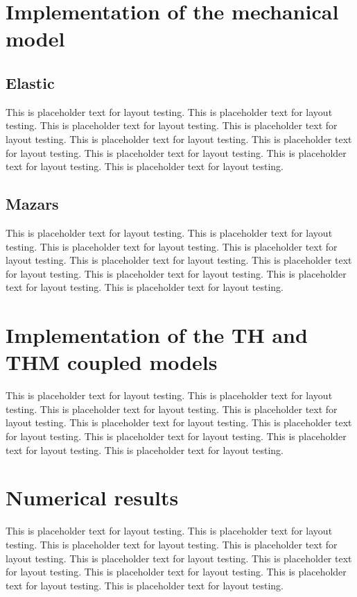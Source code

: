 \documentclass[a4paper,12pt,twoside]{report}     %
\begin{document}
\section{Implementation of the mechanical model}
\subsection{Elastic}
This is placeholder text for layout testing. This is placeholder text for layout testing. This is placeholder text for layout testing. This is placeholder text for layout testing. This is placeholder text for layout testing. This is placeholder text for layout testing. This is placeholder text for layout testing. This is placeholder text for layout testing. This is placeholder text for layout testing.
\subsection{Mazars}
This is placeholder text for layout testing. This is placeholder text for layout testing. This is placeholder text for layout testing. This is placeholder text for layout testing. This is placeholder text for layout testing. This is placeholder text for layout testing. This is placeholder text for layout testing. This is placeholder text for layout testing. This is placeholder text for layout testing.

\section{Implementation of the TH and THM coupled models}
This is placeholder text for layout testing. This is placeholder text for layout testing. This is placeholder text for layout testing. This is placeholder text for layout testing. This is placeholder text for layout testing. This is placeholder text for layout testing. This is placeholder text for layout testing. This is placeholder text for layout testing. This is placeholder text for layout testing.

\section{Numerical results}
This is placeholder text for layout testing. This is placeholder text for layout testing. This is placeholder text for layout testing. This is placeholder text for layout testing. This is placeholder text for layout testing. This is placeholder text for layout testing. This is placeholder text for layout testing. This is placeholder text for layout testing. This is placeholder text for layout testing.
\end{document}
